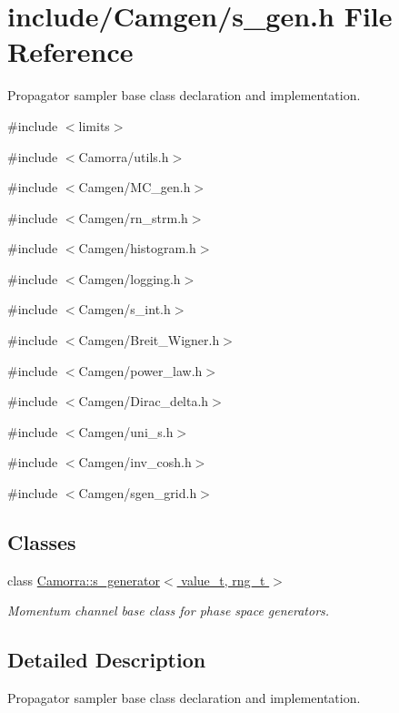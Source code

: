 \hypertarget{a00594}{
\section{include/Camgen/s\_\-gen.h File Reference}
\label{a00594}
}


Propagator sampler base class declaration and implementation.  


{\ttfamily \#include $<$limits$>$}\par
{\ttfamily \#include $<$Camorra/utils.h$>$}\par
{\ttfamily \#include $<$Camgen/MC\_\-gen.h$>$}\par
{\ttfamily \#include $<$Camgen/rn\_\-strm.h$>$}\par
{\ttfamily \#include $<$Camgen/histogram.h$>$}\par
{\ttfamily \#include $<$Camgen/logging.h$>$}\par
{\ttfamily \#include $<$Camgen/s\_\-int.h$>$}\par
{\ttfamily \#include $<$Camgen/Breit\_\-Wigner.h$>$}\par
{\ttfamily \#include $<$Camgen/power\_\-law.h$>$}\par
{\ttfamily \#include $<$Camgen/Dirac\_\-delta.h$>$}\par
{\ttfamily \#include $<$Camgen/uni\_\-s.h$>$}\par
{\ttfamily \#include $<$Camgen/inv\_\-cosh.h$>$}\par
{\ttfamily \#include $<$Camgen/sgen\_\-grid.h$>$}\par
\subsection*{Classes}
\begin{DoxyCompactItemize}
\item 
class \hyperlink{a00441}{Camorra::s\_\-generator$<$ value\_\-t, rng\_\-t $>$}
\begin{DoxyCompactList}\small\item\em Momentum channel base class for phase space generators. \end{DoxyCompactList}\end{DoxyCompactItemize}


\subsection{Detailed Description}
Propagator sampler base class declaration and implementation. 